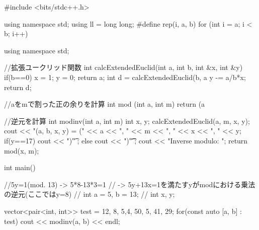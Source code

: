 \documentclass[xelatex, 11pt, a4paper, ja=standard]{bxjsarticle}
\begin{document}
\begin{mylisting}[language=c++,caption=演習課題2のソースコード]
    #include <bits/stdc++.h>

    using namespace std;
    using ll = long long;
    #define rep(i, a, b) for (int i = a; i < b; i++)
    
    
    
    using namespace std;
    
    
    //拡張ユークリッド関数
    int calcExtendedEuclid(int a, int b, int &x, int &y){  
        if(b==0){
            x = 1;
            y = 0;
            return a;
        }
        int d = calcExtendedEuclid(b, a%
        y -= a/b*x;
        return d;
    }
    
    //aをmで割った正の余りを計算
    int mod (int a, int m){
        return (a%
    }
    
    //逆元を計算
    int modinv(int a, int m){
        int x, y;
        calcExtendedEuclid(a, m, x, y);
        cout << "(a, b, x, y) = ("
        << a << ", " << m << ", " << x << ", " << y;
        if(y==17) cout << ")\t" ;
        else cout << ")\t\t" ;
        cout << "Inverse modulo: ";
        return mod(x, m);
    }
    
    int main(){
    
        //5y=1(mod. 13) -> 5*8-13*3=1 
        // -> 5y+13x=1を満たすyがmodにおける乗法の逆元(ここではy=8)
        // int a = 5, b = 13;
        // int x, y;
    
        vector<pair<int, int>> test 
        = {{12, 8}, {5,4}, {50, 5}, {41, 29}};
        for(const auto [a, b] : test){
            cout << modinv(a, b) << endl;
        }
    }
\end{mylisting}
\end{document}
